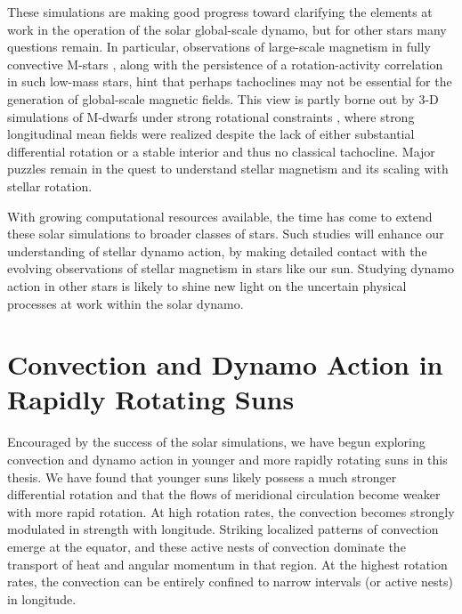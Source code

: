 These simulations are making good progress 
toward clarifying the elements at work in the operation of the solar
global-scale dynamo, but for
other stars many questions remain.  In particular, observations of
large-scale magnetism in fully convective M-stars 
\citep{Donati_et_al_2006}, along with the persistence of a rotation-activity
correlation in such low-mass stars, hint that perhaps 
tachoclines may not be essential for the generation of global-scale
magnetic fields.  This view is partly borne out by 3-D simulations of
M-dwarfs under strong rotational constraints \citep{Browning_2008}, where
strong longitudinal mean fields were realized despite the
lack of either substantial differential rotation or a stable interior
and thus no classical tachocline.  Major puzzles remain in the quest
to understand stellar magnetism and its scaling with stellar rotation.

With growing computational resources available, the time has come to
extend these solar simulations to broader classes of stars.  
Such studies will enhance our understanding
of stellar dynamo action, by making detailed contact with the evolving
observations of stellar magnetism in stars like our sun.  Studying
dynamo action in other stars is likely to shine new light on the uncertain
physical processes at work within the solar dynamo.  

\section{Convection and Dynamo Action in Rapidly Rotating Suns}
Encouraged by the success of the solar simulations, we have begun
exploring convection and dynamo action in younger and more rapidly
rotating suns in this thesis.   We have found that
younger suns likely possess a much stronger differential rotation
and that the flows of meridional circulation become weaker with more
rapid rotation.  At high rotation rates, the convection becomes strongly
modulated in strength with longitude.  Striking localized patterns
of convection emerge at the equator, and these active nests of
convection dominate the transport of heat and angular momentum in that
region.  At the highest rotation rates, the convection can be entirely
confined to narrow intervals (or active nests) in longitude.  

